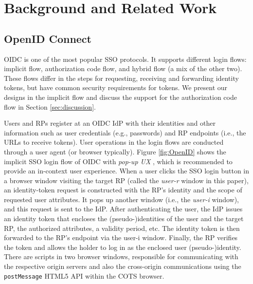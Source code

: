 \section{Background and Related Work}
\label{sec:background}

\subsection{OpenID Connect}
\label{subsec:OIDC}
OIDC is one of the most popular SSO protocols. It supports different login flows: implicit flow, authorization code flow, and hybrid flow (a mix of the other two).
These flows differ in the steps for requesting, receiving and forwarding identity tokens, but have common security requirements for tokens.
We present our designs in the implicit flow and discuss the support for the authorization code flow in Section \ref{sec:discussion}.

Users and RPs register at an OIDC IdP with their identities
and other information such as user credentials (e.g., passwords)
and RP endpoints (i.e., the URLs to receive tokens).
User operations in the login flows are conducted through a user agent (or browser typically).
Figure \ref{fig:OpenID} shows
the implicit SSO login flow of OIDC with \emph{pop-up UX} \cite{dimvaLiM16,GoogleIdIntegrate,uber},
which is recommended to provide an in-context user experience.
When a user clicks the SSO login button in a browser window visiting the target RP 
(called the \emph{user-r} window in this paper),
 an identity-token request is constructed with the RP's identity and the scope of requested user attributes.
It pops up another window (i.e., the \emph{user-i} window),
    and this request is sent to the IdP.
After authenticating the user, the IdP issues an identity token that encloses the (pseudo-)identities of the user and the target RP, the authorized attributes, a validity period, etc.
The identity token is then forwarded to the RP's endpoint via the user-i window.
Finally, the RP verifies the token and allows the holder to log in as the enclosed user (pseudo-)identity.
There are scripts in two browser windows,
    responsible for communicating with the respective origin servers
    and also the cross-origin
communications using the \verb+postMessage+ HTML5 API within the COTS browser.



